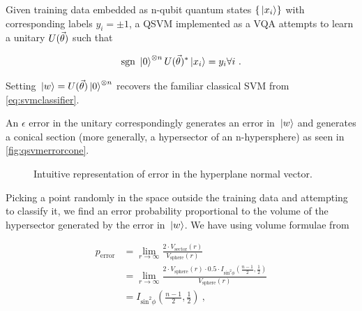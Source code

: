 
Given training data embedded as n-qubit quantum states \(\{\ket*{x_i}\}\) with
corresponding labels \({y_i = \pm 1}\), a QSVM implemented as a VQA attempts to learn a
unitary \(U(\vec{\theta})\) such that

\begin{equation}
    \text{sgn }{\ket*{0}^{\otimes n}U(\vec{\theta})^*\ket*{x_i}} = y_i \forall i~.
\end{equation}

Setting \(\ket*{w} = U(\vec{\theta})\ket*{0}^{\otimes n}\) recovers the
familiar classical SVM from \autoref{eq:svmclassifier}.

An \(\epsilon\) error in the unitary correspondingly generates an error in
\(\ket*{w}\) and generates a conical section (more generally, a hypersector of
an n-hypersphere) as seen in \autoref{fig:qsvmerrorcone}.

\begin{figure}[!ht]
    \centering
      \caption{Intuitive representation of error in the hyperplane normal vector.}
      \label{fig:qsvmerrorcone}
\end{figure}

Picking a point randomly in the space outside the training data and attempting
to classify it, we find an error probability proportional to the volume of the
hypersector generated by the error in \(\ket*{w}\). We have using volume
formulae from \cite{li2011concise}

\begin{align}
        p_{\text{error}} &= \lim_{r\to \infty}\frac{2\cdot V_{\text{sector}}(r)}{V_{\text{sphere}}(r)} \nonumber\\
            &= \lim_{r\to \infty}\frac{2\cdot V_{\text{sphere}}(r)\cdot 0.5\cdot I_{\text{sin}^2\phi}(\frac{n-1}{2}, \frac{1}{2})}{V_{\text{sphere}}(r)} \nonumber\\
            &= I_{\text{sin}^2\phi}(\frac{n-1}{2}, \frac{1}{2})~,
\end{align}

